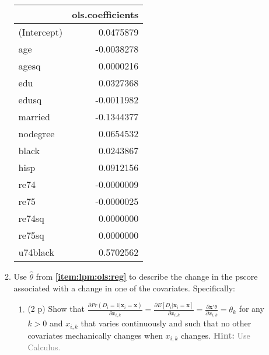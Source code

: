 \documentclass[
]{article}
\begin{document}
\begin{enumerate}
\begin{enumerate}
    \begin{longtable}[]{@{}lr@{}}
    \toprule\noalign{}
    & ols.coefficients \\
    \midrule\noalign{}
    \endhead
    \bottomrule\noalign{}
    \endlastfoot
    (Intercept) & 0.0475879 \\
    age & -0.0038278 \\
    agesq & 0.0000216 \\
    edu & 0.0327368 \\
    edusq & -0.0011982 \\
    married & -0.1344377 \\
    nodegree & 0.0654532 \\
    black & 0.0243867 \\
    hisp & 0.0912156 \\
    re74 & -0.0000009 \\
    re75 & -0.0000025 \\
    re74sq & 0.0000000 \\
    re75sq & 0.0000000 \\
    u74black & 0.5702562 \\
    \end{longtable}
  \item
    Use \(\hat{\theta}\) from \textbf{\ref{item:lpm:ols:reg}} to
    describe the change in the pscore associated with a change in one of
    the covariates. Specifically:

    \begin{enumerate}
    \def\labelenumiii{\roman{enumiii}.}
    \item
      (2 p) Show that
      \(\frac{\partial Pr(D_i=1|\mathbf{x}_{i}=\mathbf{x})}{\partial x_{i,k}} = \frac{\partial E[D_i|\mathbf{x}_{i}=\mathbf{x}]}{\partial x_{i,k}}= \frac{\partial \mathbf{x}'\theta}{\partial x_{i,k}} = \theta_k\)
      for any \(k >0\) and \(x_{i,k}\) that varies continuously and such
      that no other covariates mechanically changes when \(x_{i,k}\)
      changes. \textcolor{gray}{\textbf{Hint:} Use Calculus.}


\end{enumerate}
\end{enumerate}
\end{enumerate}
\end{document}
